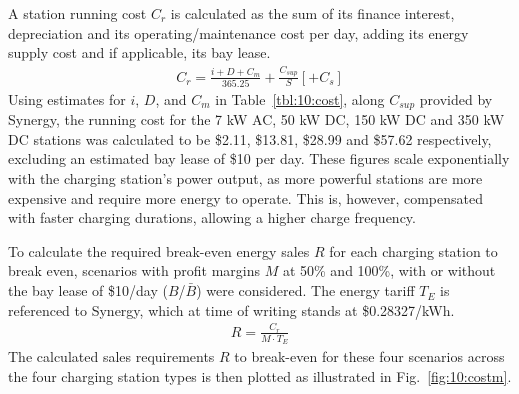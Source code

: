 A station running cost $C_r$ is calculated as the sum of its finance interest, depreciation and its operating/maintenance cost per day, adding its energy supply cost and if applicable, its bay lease.
\begin{align}
C_r = \frac{i + D + C_m}{365.25} + \frac{C_{sup}}{S}[+C_s]
\end{align}  
Using estimates for $i$, $D$, and $C_m$ in Table~\ref{tbl:10:cost}, along $C_{sup}$ provided by Synergy, the running cost for the 7 kW AC, 50 kW DC, 150 kW DC and 350 kW DC stations was calculated to be \$2.11, \$13.81, \$28.99 and \$57.62 respectively, excluding an estimated bay lease of \$10 per day. These figures scale exponentially with the charging station's power output, as more powerful stations are more expensive and require more energy to operate. This is, however, compensated with faster charging durations, allowing a higher charge frequency.


To calculate the required break-even energy sales $R$ for each charging station to break even, scenarios with profit margins $M$ at 50\% and 100\%, with or without the bay lease of \$10/day ($B$/$\bar{B}$) were considered. The energy tariff $T_E$ is referenced to Synergy, which at time of writing stands at \$0.28327/kWh. 
\begin{align}
R = \frac{C_r}{M \cdot T_E}
\end{align}
The calculated sales requirements $R$ to break-even for these four scenarios across the four charging station types is then plotted as illustrated in Fig.~\ref{fig:10:costm}.

